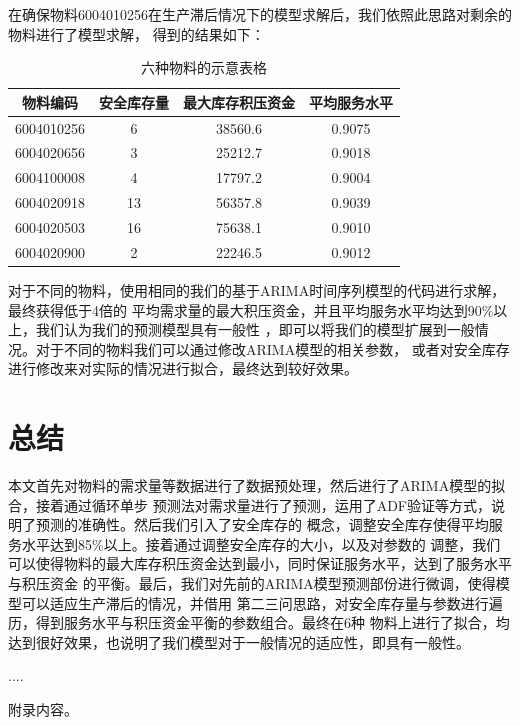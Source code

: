\documentclass{cumcmthesis}
\begin{document}
        在确保物料6004010256在生产滞后情况下的模型求解后，我们依照此思路对剩余的物料进行了模型求解，
        得到的结果如下：\\

        \begin{table}[htbp]
            \centering
            \caption{六种物料的示意表格}
            \label{tab:example-data}
            
            \begin{tabular}{cccc} %
            \toprule
            物料编码 & 安全库存量 & 最大库存积压资金 & 平均服务水平 \\
            \midrule
            6004010256 & 6 & 38560.6 & 0.9075 \\
            6004020656 & 3 & 25212.7 & 0.9018 \\
            6004100008 & 4 & 17797.2 & 0.9004 \\
            6004020918 & 13 & 56357.8 & 0.9039 \\
            6004020503 & 16 & 75638.1 & 0.9010 \\
            6004020900 & 2 & 22246.5 & 0.9012 \\
            \bottomrule
            \end{tabular}
        \end{table}

        对于不同的物料，使用相同的我们的基于ARIMA时间序列模型的代码进行求解，最终获得低于4倍的
        平均需求量的最大积压资金，并且平均服务水平均达到90\%以上，我们认为我们的预测模型具有一般性
        ，即可以将我们的模型扩展到一般情况。对于不同的物料我们可以通过修改ARIMA模型的相关参数，
        或者对安全库存进行修改来对实际的情况进行拟合，最终达到较好效果。\\

        \section{总结}
        本文首先对物料的需求量等数据进行了数据预处理，然后进行了ARIMA模型的拟合，接着通过循环单步
        预测法对需求量进行了预测，运用了ADF验证等方式，说明了预测的准确性。然后我们引入了安全库存的
        概念，调整安全库存使得平均服务水平达到85\%以上。接着通过调整安全库存的大小，以及对参数的
        调整，我们可以使得物料的最大库存积压资金达到最小，同时保证服务水平，达到了服务水平与积压资金
        的平衡。最后，我们对先前的ARIMA模型预测部份进行微调，使得模型可以适应生产滞后的情况，并借用
        第二三问思路，对安全库存量与参数进行遍历，得到服务水平与积压资金平衡的参数组合。最终在6种
        物料上进行了拟合，均达到很好效果，也说明了我们模型对于一般情况的适应性，即具有一般性。\\
        \begin{thebibliography}{9}%
             ....
        \end{thebibliography}
        \begin{appendices}
            附录内容。
        \end{appendices}
    
\end{document}
